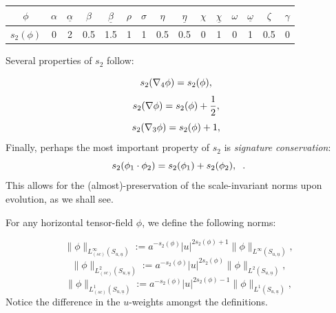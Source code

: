\documentclass{amsart}
\newcommand{\omegabar}{\underline{\omega}}
\newcommand{\chibar}{\underline{\chi}}
\newcommand{\ubar}{\underline{u}}
\newcommand{\be}{\begin{equation}}
\newcommand{\ee}{\end{equation}}
\newcommand{\scaleinfinitySu}[1]{\lVert{#1} \rVert_{L^\infty_{(sc)}(S_{u,\ubar})}}
\newcommand{\twoSu}[1]{\lVert{#1} \rVert_{L^2(S_{u,\ubar})}}
\newcommand{\inftySu}[1]{\lVert{#1} \rVert_{L^{\infty}(S_{u,\ubar})}}
\newcommand{\oneSu}[1]{\lVert{#1}\rVert_{L^1(S_{u,\ubar})}}
\newcommand{\scaletwoSu}[1]{\lVert{#1} \rVert_{L^2_{(sc)}(S_{u,\ubar})}}
\newcommand{\scaleoneSu}[1]{\lVert{#1} \rVert_{L^1_{(sc)}(S_{u,\ubar})}}
\newcommand{\alphabar}{\underline{\alpha}}
\newcommand{\betabar}{\underline{\beta}}
\newcommand{\etabar}{\underline{\eta}}
\begin{document}
{\renewcommand{\arraystretch}{1.25}
\begin{center}
\begin{tabular}{||c || c c c c c c c c c c c c c c||} 
 \hline$\phi$ &
 $\alpha$ & $\alphabar$ & $\beta$ & $\betabar$ &$\rho$ &$\sigma$ & $\eta$ & $\etabar$ & $\chi$ &$\chibar$ & $\omega$ & $\omegabar$ & $\zeta$ & $\gamma$  \\ [1ex]  \hline\hline
 $s_2(\phi)$ & 0 & 2 & 0.5 & 1.5 & 1  & 1 & 0.5 & 0.5  &0 & 1&0 & 1&0.5 &0 \\ 
 \hline
\end{tabular}
\end{center}


\par\noindent Several properties of $s_2$ follow:

\[ s_2(\nabla_4 \phi) = s_2(\phi), \hspace{2mm} \]\[s_2(\nabla \phi) = s_2(\phi) +\frac{1}{2}, \hspace{2mm}\]\[s_2(\nabla_3 \phi) = s_2(\phi) +1, \hspace{2mm} \]Finally, perhaps the most important property of $s_2$ is \textit{signature conservation}: \be \label{sc} s_2(\phi_1 \cdot\phi_2) = s_2(\phi_1)+ s_2(\phi_2), \hspace{2mm}. \ee This allows for the (almost)-preservation of the scale-invariant norms upon evolution, as we shall see. 

\vspace{3mm}

\noindent For any horizontal tensor-field $\phi$, we define the following norms:

\begin{equation}
    \scaleinfinitySu{\phi} := a^{-s_2(\phi)} \lvert u \rvert^{2s_2(\phi)+1}\inftySu{\phi},
\end{equation}
\begin{equation}
       \scaletwoSu{\phi} := a^{-s_2(\phi)} \lvert u \rvert^{2s_2(\phi)}\twoSu{\phi},
\end{equation}
\begin{equation}
       \scaleoneSu{\phi} := a^{-s_2(\phi)} \lvert u \rvert^{2s_2(\phi)-1}\oneSu{\phi},
\end{equation}
Notice the difference in the $u$-weights amongst the definitions. 

\vspace{3mm}

}
\end{document}
